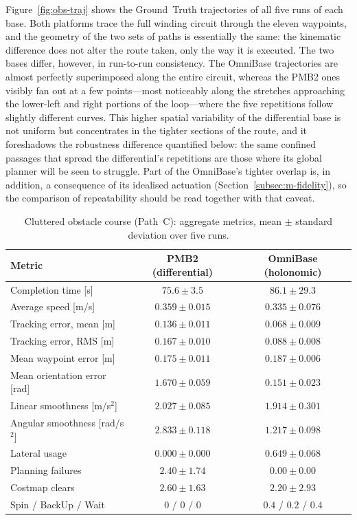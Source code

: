 Figure~\ref{fig:obs-traj} shows the Ground~Truth trajectories of all five runs of each base. Both platforms trace the full winding circuit through the eleven waypoints, and the geometry of the two sets of paths is essentially the same: the kinematic difference does not alter the route taken, only the way it is executed. The two bases differ, however, in run-to-run consistency. The OmniBase trajectories are almost perfectly superimposed along the entire circuit, whereas the PMB2 ones visibly fan out at a few points---most noticeably along the stretches approaching the lower-left and right portions of the loop---where the five repetitions follow slightly different curves. This higher spatial variability of the differential base is not uniform but concentrates in the tighter sections of the route, and it foreshadows the robustness difference quantified below: the same confined passages that spread the differential's repetitions are those where its global planner will be seen to struggle. Part of the OmniBase's tighter overlap is, in addition, a consequence of its idealised actuation (Section~\ref{subsec:m-fidelity}), so the comparison of repeatability should be read together with that caveat.

\begin{table}[htbp]
\centering
\caption{Cluttered obstacle course (Path~C): aggregate metrics, mean $\pm$ standard deviation over five runs.}
\label{tab:obs}
\begin{tabular}{lcc}
\toprule
Metric & PMB2 (differential) & OmniBase (holonomic) \\
\midrule
Completion time [s]            & $75.6 \pm 3.5$ & $86.1 \pm 29.3$ \\
Average speed [m/s]            & $0.359 \pm 0.015$ & $0.335 \pm 0.076$ \\
Tracking error, mean [m]      & $0.136 \pm 0.011$ & $0.068 \pm 0.009$ \\
Tracking error, RMS [m]       & $0.167 \pm 0.010$ & $0.088 \pm 0.008$ \\
Mean waypoint error [m]       & $0.175 \pm 0.011$ & $0.187 \pm 0.006$ \\
Mean orientation error [rad]  & $1.670 \pm 0.059$ & $0.151 \pm 0.023$ \\
Linear smoothness [m/s$^2$]   & $2.027 \pm 0.085$ & $1.914 \pm 0.301$ \\
Angular smoothness [rad/s$^2$] & $2.833 \pm 0.118$ & $1.217 \pm 0.098$ \\
Lateral usage                  & $0.000 \pm 0.000$ & $0.649 \pm 0.068$ \\
Planning failures              & $2.40 \pm 1.74$ & $0.00 \pm 0.00$ \\
Costmap clears                 & $2.60 \pm 1.63$ & $2.20 \pm 2.93$ \\
Spin / BackUp / Wait           & $0$ / $0$ / $0$ & $0.4$ / $0.2$ / $0.4$ \\
\bottomrule
\end{tabular}
\end{table}

